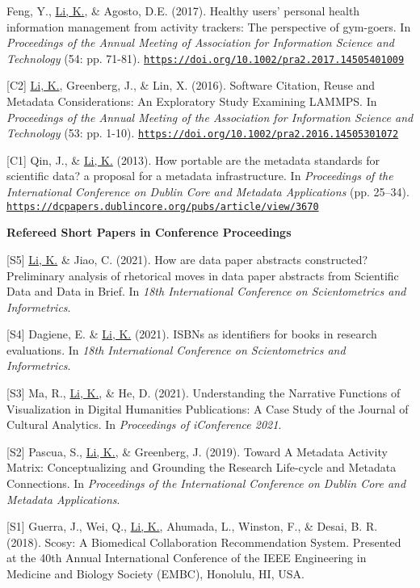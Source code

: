 \documentclass[margin, 10pt]{res} %
\begin{document}
\begin{resume}
[C3] Feng, Y., \underline{Li, K.}, \& Agosto, D.E. (2017). Healthy users’ personal health information management from activity trackers: The perspective of gym-goers. In \textit{Proceedings of the Annual Meeting of Association for Information Science and Technology} (54: pp. 71-81). \href{https://doi.org/10.1002/pra2.2017.14505401009}{\nolinkurl{https://doi.org/10.1002/pra2.2017.14505401009}}

[C2] \underline{Li, K.}, Greenberg, J., \& Lin, X. (2016). Software Citation, Reuse and Metadata Considerations: An Exploratory Study Examining LAMMPS. In \textit{Proceedings of the Annual Meeting of the Association for Information Science and Technology} (53: pp. 1-10). \href{https://doi.org/10.1002/pra2.2016.14505301072}{\nolinkurl{https://doi.org/10.1002/pra2.2016.14505301072}}

[C1] Qin, J., \& \underline{Li, K.} (2013). How portable are the metadata standards for scientific data? a proposal for a metadata infrastructure. In \textit{Proceedings of the International Conference on Dublin Core and Metadata Applications} (pp. 25–34). \href{https://dcpapers.dublincore.org/pubs/article/view/3670}{\nolinkurl{https://dcpapers.dublincore.org/pubs/article/view/3670}}

\textbf{Refereed Short Papers in Conference Proceedings}

[S5] \underline{Li, K.} \& Jiao, C. (2021). How are data paper abstracts constructed? Preliminary analysis of rhetorical moves in data paper abstracts from Scientific Data and Data in Brief. In \textit{18th International Conference on Scientometrics and Informetrics}.

[S4] Dagiene, E. \& \underline{Li, K.} (2021). ISBNs as identifiers for books in research evaluations. In \textit{18th International Conference on Scientometrics and Informetrics}.

[S3] Ma, R., \underline{Li, K.}, \& He, D. (2021). Understanding the Narrative Functions of Visualization in Digital Humanities Publications: A Case Study of the Journal of Cultural Analytics. In \textit{Proceedings of iConference 2021}.

[S2] Pascua, S., \underline{Li, K.}, \& Greenberg, J. (2019). Toward A Metadata Activity Matrix: Conceptualizing and Grounding the Research Life-cycle and Metadata Connections. In \textit{Proceedings of the International Conference on Dublin Core and Metadata Applications}.

[S1] Guerra, J., Wei, Q., \underline{Li, K.}, Ahumada, L., Winston, F., \& Desai, B. R. (2018). Scosy: A Biomedical Collaboration Recommendation System. Presented at the 40th Annual International Conference of the IEEE Engineering in Medicine and Biology Society (EMBC), Honolulu, HI, USA.


\end{resume}
\end{document}
